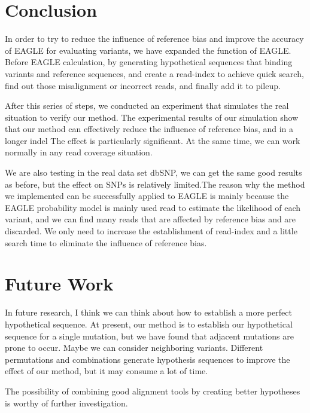 \hspace{24pt}

\section{Conclusion}
In order to try to reduce the influence of reference bias and improve the accuracy of EAGLE for evaluating variants, we have expanded the function of EAGLE. Before EAGLE calculation, by generating hypothetical sequences that binding variants and reference sequences, and create a read-index to achieve quick search, find out those misalignment or incorrect reads, and finally add it to pileup.

After this series of steps, we conducted an experiment that simulates the real situation to verify our method. The experimental results of our simulation show that our method can effectively reduce the influence of reference bias, and in a longer indel The effect is particularly significant. At the same time, we can work normally in any read coverage situation.

We are also testing in the real data set dbSNP, we can get the same good results as before, but the effect on SNPs is relatively limited.The reason why the method we implemented can be successfully applied to EAGLE is mainly because the EAGLE probability model is mainly used read to estimate the likelihood of each variant, and we can find many reads that are affected by reference bias and are discarded. We only need to increase the establishment of read-index and a little search time to eliminate the influence of reference bias.

\section{Future Work}
In future research, I think we can think about how to establish a more perfect hypothetical sequence. At present, our method is to establish our hypothetical sequence for a single mutation, but we have found that adjacent mutations are prone to occur. Maybe we can consider neighboring variants. Different permutations and combinations generate hypothesis sequences to improve the effect of our method, but it may consume a lot of time.

The possibility of combining good alignment tools by creating better hypotheses is worthy of further investigation.